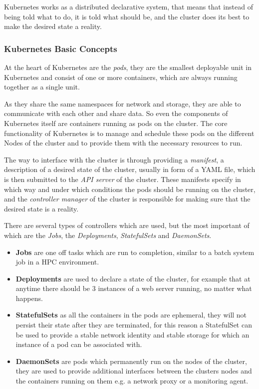 Kubernetes works as a distributed declarative system,
that means that instead of being told what to do, it is told what should be,
and the cluster does its best to make the desired state a reality.


\subsubsection{Kubernetes Basic Concepts}


At the heart of Kubernetes are the \textit{pods}, they are the smallest deployable unit in Kubernetes
and consist of one or more containers, which are always running together as a single unit.

As they share the same namespaces for network and storage, they are able to communicate with each other and share data.
So even the components of Kubernetes itself are containers running as pods on the cluster.
The core functionality of Kubernetes is to manage and schedule these pods on the different \gls{Node}s of the cluster
and to provide them with the necessary resources to run.

The way to interface with the cluster is through providing a \textit{manifest}, a description of a desired state of the cluster,
usually in form of a \acs{YAML} file, which is then submitted to the \textit{API server} of the cluster.
These manifests specify in which way and under which conditions the pods should be running on the cluster,
and the \textit{controller manager} of the cluster is responsible for making sure that the desired state is a reality.

There are several types of controllers which are used, but the most important of which are the \textit{Jobs}, the \textit{Deployments}, \textit{StatefulSets} and \textit{DaemonSets}.


\begin{itemize}
    \item \textbf{Jobs} are one off tasks which are run to completion, similar to a \gls{batch system} job in a \ac{HPC} environment.
    \item \textbf{Deployments} are used to declare a state of the cluster,
          for example that at anytime there should be 3 instances of a web server running, no matter what happens.
    \item \textbf{StatefulSets} as all the containers in the pods are ephemeral, they will not persist their state after they are terminated,
          for this reason a StatefulSet can be used to provide a stable network identity and stable storage for which an instance of a pod can be associated with.
    \item \textbf{DaemonSets} are pods which permanently run on the nodes of the cluster,
          they are used to provide additional interfaces between the clusters nodes and the containers running on them e.g. a network proxy or a monitoring agent.
\end{itemize}

